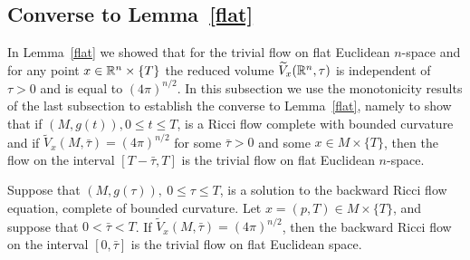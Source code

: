 \subsection{Converse to Lemma~{\ref{flat}}}

In Lemma~\ref{flat} we showed that for the trivial flow on flat
Euclidean $n$-space and for any point $x\in \mathbb{R}^n\times \{T\}$ the
reduced volume $\widetilde V_x(\mathbb{R}^n,\tau)$ is independent of
$\tau>0$  and is equal to $(4\pi)^{n/2}$. In this subsection we use
the monotonicity results of the last subsection to establish the
converse to Lemma~\ref{flat}, namely to show that if $(M,g(t)),0\le
t\le T$, is a Ricci flow complete with bounded curvature and if
$\widetilde V_x(M,\bar\tau)=(4\pi)^{n/2}$ for some $\bar\tau>0$ and
some $x\in M\times\{T\}$, then the flow on the interval
$[T-\bar\tau,T]$ is the trivial flow on flat Euclidean $n$-space.



\begin{proposition}
\label{prop:reduced-volume-rigidity}\label{4picase}

Suppose that $(M,g(\tau)),\ 0\le \tau\le T$,
 is a solution to the backward Ricci flow
equation, complete of bounded curvature. Let $x=(p,T)\in M\times
\{T\}$, and suppose that $0<\bar\tau<T$. If $\widetilde
V_x(M,\bar\tau)=(4\pi)^{n/2}$, then the backward Ricci flow on the
interval $[0,\bar\tau]$ is the trivial flow on flat Euclidean space.
\end{proposition}

